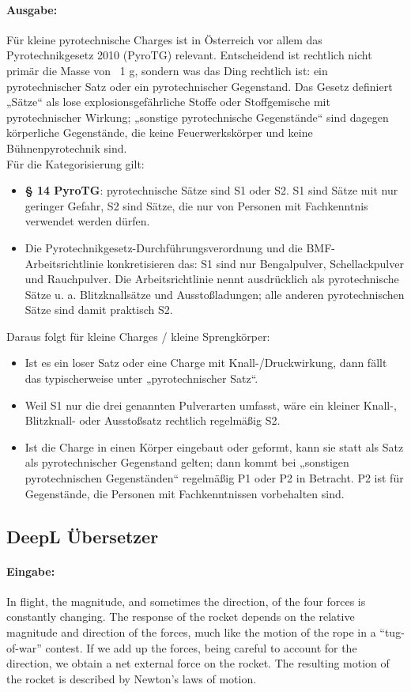 \paragraph{Ausgabe:}
Für kleine pyrotechnische Charges ist in Österreich vor allem das Pyrotechnikgesetz 2010 (PyroTG) relevant. Entscheidend ist rechtlich nicht primär die Masse von ~1 g, sondern was das Ding rechtlich ist: ein pyrotechnischer Satz oder ein pyrotechnischer Gegenstand. Das Gesetz definiert „Sätze“ als lose explosionsgefährliche Stoffe oder Stoffgemische mit pyrotechnischer Wirkung; „sonstige pyrotechnische Gegenstände“ sind dagegen körperliche Gegenstände, die keine Feuerwerkskörper und keine Bühnenpyrotechnik sind. \\
Für die Kategorisierung gilt:
\begin{itemize}
    \item \textbf{§ 14 PyroTG}: pyrotechnische Sätze sind S1 oder S2. S1 sind Sätze mit nur geringer Gefahr, S2 sind Sätze, die nur von Personen mit Fachkenntnis verwendet werden dürfen.
    \item Die Pyrotechnikgesetz-Durchführungsverordnung und die BMF-Arbeitsrichtlinie konkretisieren das: S1 sind nur Bengalpulver, Schellackpulver und Rauchpulver. Die Arbeitsrichtlinie nennt ausdrücklich als pyrotechnische Sätze u. a. Blitzknallsätze und Ausstoßladungen; alle anderen pyrotechnischen Sätze sind damit praktisch S2.
\end{itemize}
Daraus folgt für kleine Charges / kleine Sprengkörper:
\begin{itemize}
    \item Ist es ein loser Satz oder eine Charge mit Knall-/Druckwirkung, dann fällt das typischerweise unter „pyrotechnischer Satz“.
    \item Weil S1 nur die drei genannten Pulverarten umfasst, wäre ein kleiner Knall-, Blitzknall- oder Ausstoßsatz rechtlich regelmäßig S2.
    \item Ist die Charge in einen Körper eingebaut oder geformt, kann sie statt als Satz als pyrotechnischer Gegenstand gelten; dann kommt bei „sonstigen pyrotechnischen Gegenständen“ regelmäßig P1 oder P2 in Betracht. P2 ist für Gegenstände, die Personen mit Fachkenntnissen vorbehalten sind.
\end{itemize}

\subsection{DeepL Übersetzer}
\label{subsec:deepl_translate}
\paragraph{Eingabe:}
In flight, the magnitude, and sometimes the direction, of the four forces is constantly changing. The response of the rocket depends on the relative magnitude and direction of the forces, much like the motion of the rope in a “tug-of-war” contest. If we add up the forces, being careful to account for the direction, we obtain a net external force on the rocket. The resulting motion of the rocket is described by Newton's laws of motion.

